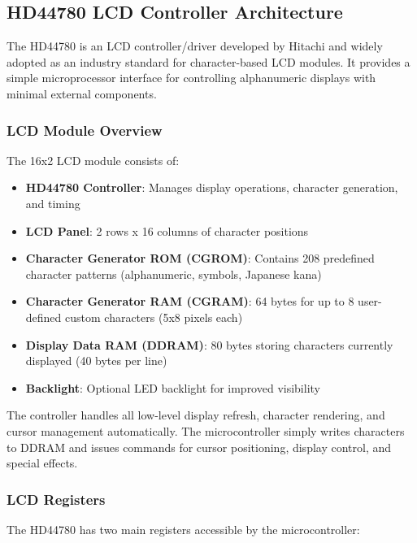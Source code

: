 \subsection{HD44780 LCD Controller Architecture}

The HD44780 is an LCD controller/driver developed by Hitachi and widely adopted as an industry standard for character-based LCD modules. It provides a simple microprocessor interface for controlling alphanumeric displays with minimal external components.

\subsubsection{LCD Module Overview}

The 16x2 LCD module consists of:
\begin{itemize}[nosep]
  \item \textbf{HD44780 Controller}: Manages display operations, character generation, and timing
  \item \textbf{LCD Panel}: 2 rows x 16 columns of character positions
  \item \textbf{Character Generator ROM (CGROM)}: Contains 208 predefined character patterns (alphanumeric, symbols, Japanese kana)
  \item \textbf{Character Generator RAM (CGRAM)}: 64 bytes for up to 8 user-defined custom characters (5x8 pixels each)
  \item \textbf{Display Data RAM (DDRAM)}: 80 bytes storing characters currently displayed (40 bytes per line)
  \item \textbf{Backlight}: Optional LED backlight for improved visibility
\end{itemize}

\noindent
The controller handles all low-level display refresh, character rendering, and cursor management automatically. The microcontroller simply writes characters to DDRAM and issues commands for cursor positioning, display control, and special effects.

\subsubsection{LCD Registers}

The HD44780 has two main registers accessible by the microcontroller:

